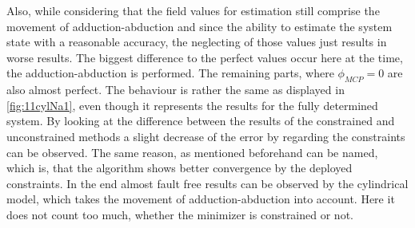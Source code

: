 Also, while considering that the field values for estimation still comprise the movement of adduction-abduction and since the ability to estimate the system state with a reasonable accuracy, the neglecting of those values just results in worse results. The biggest difference to the perfect values occur here at the time, the adduction-abduction is performed. The remaining parts, where $ \phi_{MCP} = 0 $ are also almost perfect. The behaviour is rather the same as displayed in \ref{fig:11cylNa1}, even though it represents the results for the fully determined system. By looking at the difference between the results of the constrained and unconstrained methods a slight decrease of the error by regarding the constraints can be observed. The same reason, as mentioned beforehand can be named, which is, that the algorithm shows better convergence by the deployed constraints. In the end almost fault free results can be observed by the cylindrical model, which takes the movement of adduction-abduction into account. Here it does not count too much, whether the minimizer is constrained or not. 
